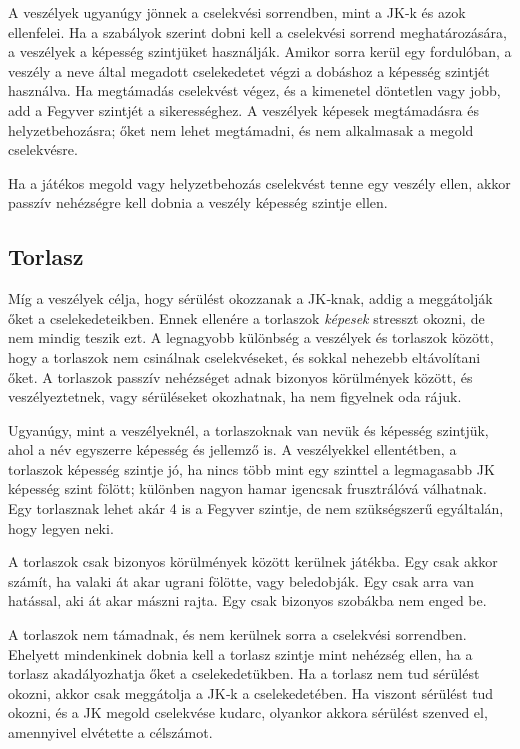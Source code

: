 A veszélyek ugyanúgy jönnek a cselekvési sorrendben, mint a JK‑k és azok ellenfelei. Ha a szabályok szerint dobni kell a cselekvési sorrend meghatározására, a veszélyek a képesség szintjüket használják. Amikor sorra kerül egy fordulóban, a veszély a neve által megadott cselekedetet végzi a dobáshoz a képesség szintjét használva. Ha megtámadás cselekvést végez, és a kimenetel döntetlen vagy jobb, add a Fegyver szintjét a sikerességhez. A veszélyek képesek megtámadásra és helyzetbehozásra; őket nem lehet megtámadni, és nem alkalmasak a megold cselekvésre.

Ha a játékos megold vagy helyzetbehozás cselekvést tenne egy veszély ellen, akkor passzív nehézségre kell dobnia a veszély képesség szintje ellen.

\newpage

\subsection{Torlasz}

Míg a veszélyek célja, hogy sérülést okozzanak a JK‑knak, addig a  meggátolják őket a cselekedeteikben. Ennek ellenére a torlaszok \emph{képesek} stresszt okozni, de nem mindig teszik ezt. A legnagyobb különbség a veszélyek és torlaszok között, hogy a torlaszok nem csinálnak cselekvéseket, és sokkal nehezebb eltávolítani őket. A torlaszok passzív nehézséget adnak bizonyos körülmények között, és veszélyeztetnek, vagy sérüléseket okozhatnak, ha nem figyelnek oda rájuk.

Ugyanúgy, mint a veszélyeknél, a torlaszoknak van nevük és képesség szintjük, ahol a név egyszerre képesség és jellemző is. A veszélyekkel ellentétben, a torlaszok képesség szintje jó, ha nincs több mint egy szinttel a legmagasabb JK képesség szint fölött; különben nagyon hamar igencsak frusztrálóvá válhatnak. Egy torlasznak lehet akár 4 is a Fegyver szintje, de nem szükségszerű egyáltalán, hogy legyen neki.

A torlaszok csak bizonyos körülmények között kerülnek játékba. Egy  csak akkor számít, ha valaki át akar ugrani fölötte, vagy beledobják. Egy  csak arra van hatással, aki át akar mászni rajta. Egy  csak bizonyos szobákba nem enged be.

A torlaszok nem támadnak, és nem kerülnek sorra a cselekvési sorrendben. Ehelyett mindenkinek dobnia kell a torlasz szintje mint nehézség ellen, ha a torlasz akadályozhatja őket a cselekedetükben. Ha a torlasz nem tud sérülést okozni, akkor csak meggátolja a JK‑k a cselekedetében. Ha viszont sérülést tud okozni, és a JK megold cselekvése kudarc, olyankor akkora sérülést szenved el, amennyivel elvétette a célszámot.

